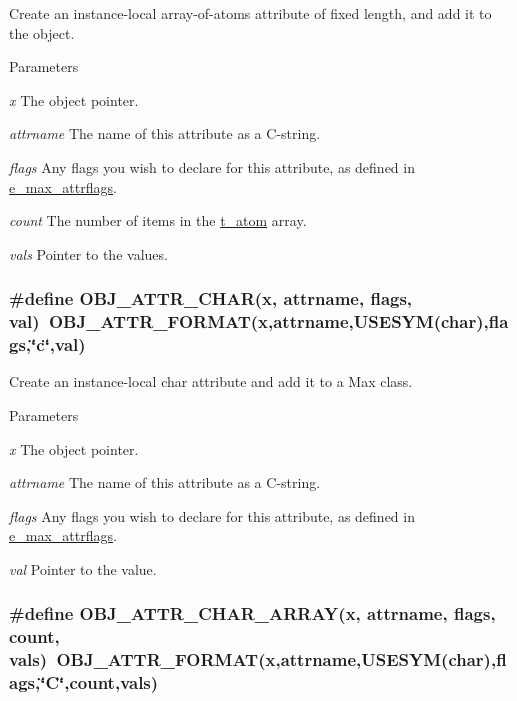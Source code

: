 Create an instance-\/local array-\/of-\/atoms attribute of fixed length, and add it to the object. 
\begin{DoxyParams}{Parameters}
\item[{\em x}]The object pointer. \item[{\em attrname}]The name of this attribute as a C-\/string. \item[{\em flags}]Any flags you wish to declare for this attribute, as defined in \hyperlink{group__attr_gaf296cfc6741bb19207f6ed8062809115}{e\_\-max\_\-attrflags}. \item[{\em count}]The number of items in the \hyperlink{structt__atom}{t\_\-atom} array. \item[{\em vals}]Pointer to the values. \end{DoxyParams}
\hypertarget{group__attr_gabea8a22ac97106d528dfab8e2245a5dd}{
\subsubsection[{OBJ\_\-ATTR\_\-CHAR}]{\setlength{\rightskip}{0pt plus 5cm}\#define OBJ\_\-ATTR\_\-CHAR(x, \/  attrname, \/  flags, \/  val)~OBJ\_\-ATTR\_\-FORMAT(x,attrname,USESYM(char),flags,\char`\"{}c\char`\"{},val)}}
\label{group__attr_gabea8a22ac97106d528dfab8e2245a5dd}


Create an instance-\/local char attribute and add it to a Max class. 
\begin{DoxyParams}{Parameters}
\item[{\em x}]The object pointer. \item[{\em attrname}]The name of this attribute as a C-\/string. \item[{\em flags}]Any flags you wish to declare for this attribute, as defined in \hyperlink{group__attr_gaf296cfc6741bb19207f6ed8062809115}{e\_\-max\_\-attrflags}. \item[{\em val}]Pointer to the value. \end{DoxyParams}
\hypertarget{group__attr_ga46772e0865cd498f00c4a210daa673d1}{
\subsubsection[{OBJ\_\-ATTR\_\-CHAR\_\-ARRAY}]{\setlength{\rightskip}{0pt plus 5cm}\#define OBJ\_\-ATTR\_\-CHAR\_\-ARRAY(x, \/  attrname, \/  flags, \/  count, \/  vals)~OBJ\_\-ATTR\_\-FORMAT(x,attrname,USESYM(char),flags,\char`\"{}C\char`\"{},count,vals)}}
\label{group__attr_ga46772e0865cd498f00c4a210daa673d1}


